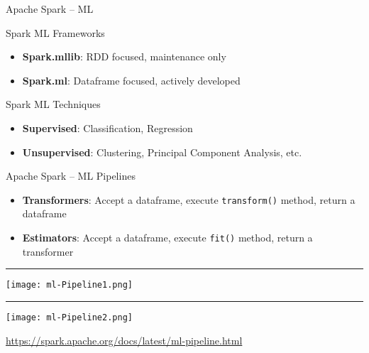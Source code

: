 \documentclass[ignorenonframetext,xcolor=x11names]{beamer}
\begin{document}
\begin{frame}{Apache Spark -- ML}
\begin{block}{Spark ML Frameworks}
\begin{itemize}
   \item \textbf{Spark.mllib}: RDD focused, maintenance only
   \item \textbf{Spark.ml}: Dataframe focused, actively developed
\end{itemize}
\end{block}
\begin{block}{Spark ML Techniques}
\begin{itemize}
   \item \textbf{Supervised}: Classification, Regression
   \item \textbf{Unsupervised}: Clustering, Principal Component Analysis, etc.
\end{itemize}
\end{block}
\end{frame}

\begin{frame}{Apache Spark -- ML Pipelines}
\begin{itemize}
   \item \textbf{Transformers}: Accept a dataframe, execute \texttt{transform()} method, return a dataframe
   \item \textbf{Estimators}: Accept a dataframe, execute \texttt{fit()} method, return a transformer
\end{itemize}
\vspace{.5\baselineskip}
\hrule
\vspace{.5\baselineskip}
\centering
\texttt{[image: ml-Pipeline1.png]} 

\vspace{.5\baselineskip}

\hrule

\vspace{.5\baselineskip}

\texttt{[image: ml-Pipeline2.png]} 

\scriptsize \url{https://spark.apache.org/docs/latest/ml-pipeline.html} \normalsize
\end{frame}
\end{document}
